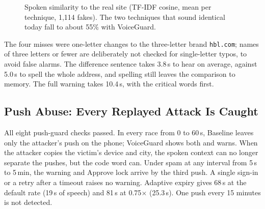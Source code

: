 \documentclass[conference]{IEEEtran}
\newcommand{\dom}[1]{\texttt{#1}}
\begin{document}
\begin{figure}[t]
\centering
{}
\caption{Spoken similarity to the real site (TF-IDF cosine, mean per technique, 1,114 fakes). The two techniques that sound identical today fall to about 55\% with VoiceGuard.}
\label{fig:similarity}
\end{figure}

The four misses were one-letter changes to the three-letter brand \dom{hbl.com}; names of three letters or fewer are deliberately not checked for single-letter typos, to avoid false alarms. The difference sentence takes 3.8\,s to hear on average, against 5.0\,s to spell the whole address, and spelling still leaves the comparison to memory. The full warning takes 10.4\,s, with the critical words first.

\subsection{Push Abuse: Every Replayed Attack Is Caught}

All eight push-guard checks passed. In every race from 0 to 60\,s, Baseline leaves only the attacker's push on the phone; VoiceGuard shows both and warns. When the attacker copies the victim's device and city, the spoken context can no longer separate the pushes, but the code word can. Under spam at any interval from 5\,s to 5\,min, the warning and Approve lock arrive by the third push. A single sign-in or a retry after a timeout raises no warning. Adaptive expiry gives 68\,s at the default rate (19\,s of speech) and 81\,s at 0.75$\times$ (25.3\,s). One push every 15 minutes is not detected.
\end{document}
